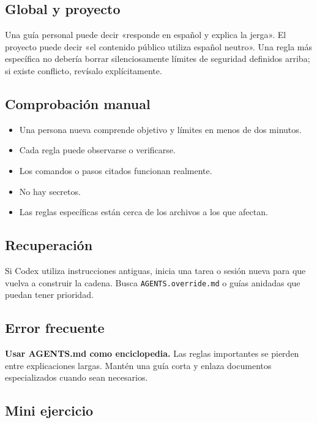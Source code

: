 \documentclass[10pt,a4paper,openany]{book}
\providecommand{\tightlist}{\setlength{\itemsep}{0.18em}\setlength{\parskip}{0pt}}
\begin{document}
\subsection{Global y proyecto}\label{global-y-proyecto}

Una guía personal puede decir «responde en español y explica la jerga».
El proyecto puede decir «el contenido público utiliza español neutro».
Una regla más específica no debería borrar silenciosamente límites de
seguridad definidos arriba; si existe conflicto, revísalo
explícitamente.

\subsection{Comprobación manual}\label{comprobaciuxf3n-manual-10}

\begin{itemize}
\tightlist
\item
  Una persona nueva comprende objetivo y límites en menos de dos
  minutos.
\item
  Cada regla puede observarse o verificarse.
\item
  Los comandos o pasos citados funcionan realmente.
\item
  No hay secretos.
\item
  Las reglas específicas están cerca de los archivos a los que afectan.
\end{itemize}

\subsection{Recuperación}\label{recuperaciuxf3n-13}

Si Codex utiliza instrucciones antiguas, inicia una tarea o sesión nueva
para que vuelva a construir la cadena. Busca \texttt{AGENTS.override.md}
o guías anidadas que puedan tener prioridad.

\subsection{Error frecuente}\label{error-frecuente-15}

\textbf{Usar AGENTS.md como enciclopedia.} Las reglas importantes se
pierden entre explicaciones largas. Mantén una guía corta y enlaza
documentos especializados cuando sean necesarios.

\subsection{Mini ejercicio}\label{mini-ejercicio-11}
\end{document}
